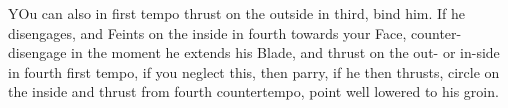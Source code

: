YOu can also in first tempo thrust on the outside in third, bind
him. If he disengages, and Feints on the inside in fourth towards your
Face, counter-disengage in the moment he extends his Blade, and thrust
on the out- or in-side in fourth first tempo, if you neglect this,
then parry, if he then thrusts, circle on the inside and thrust from
fourth countertempo, point well lowered to his groin.


